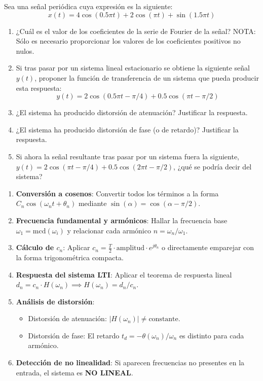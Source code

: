 \newpage
\begin{problema}
Sea una señal periódica cuya expresión es la siguiente:
\[
x(t) = 4\cos(0.5\pi t) + 2\cos(\pi t) + \sin(1.5\pi t)
\]
\begin{enumerate}[label=\alph*)]
    \item ¿Cuál es el valor de los coeficientes de la serie de Fourier de la señal? NOTA: Sólo es necesario proporcionar los valores de los coeficientes positivos no nulos.
    \item Si tras pasar por un sistema lineal estacionario se obtiene la siguiente señal $y(t)$, proponer la función de transferencia de un sistema que pueda producir esta respuesta:
    \[
    y(t) = 2\cos(0.5\pi t - \pi/4) + 0.5\cos(\pi t - \pi/2)
    \]
    \item ¿El sistema ha producido distorsión de atenuación? Justificar la respuesta.
    \item ¿El sistema ha producido distorsión de fase (o de retardo)? Justificar la respuesta.
    \item Si ahora la señal resultante tras pasar por un sistema fuera la siguiente, $y(t) = 2\cos(\pi t - \pi/4) + 0.5\cos(2\pi t - \pi/2)$, ¿qué se podría decir del sistema?
\end{enumerate}
\end{problema}

\begin{mecanizado}
\begin{enumerate}
    \item \textbf{Conversión a cosenos}: Convertir todos los términos a la forma $C_n \cos(\omega_n t + \theta_n)$ mediante $\sin(\alpha) = \cos(\alpha - \pi/2)$.
    \item \textbf{Frecuencia fundamental y armónicos}: Hallar la frecuencia base $\omega_1 = \text{mcd}(\omega_i)$ y relacionar cada armónico $n = \omega_n / \omega_1$.
    \item \textbf{Cálculo de $c_n$}: Aplicar $c_n = \frac{T}{2} \cdot \text{amplitud} \cdot e^{j\theta_n}$ o directamente emparejar con la forma trigonométrica compacta.
    \item \textbf{Respuesta del sistema LTI}: Aplicar el teorema de respuesta lineal $d_n = c_n \cdot H(\omega_n) \implies H(\omega_n) = d_n / c_n$.
    \item \textbf{Análisis de distorsión}:
    \begin{itemize}
        \item Distorsión de atenuación: $|H(\omega_n)| \neq \text{constante}$.
        \item Distorsión de fase: El retardo $t_d = -\theta(\omega_n)/\omega_n$ es distinto para cada armónico.
    \end{itemize}
    \item \textbf{Detección de no linealidad}: Si aparecen frecuencias no presentes en la entrada, el sistema es \textbf{NO LINEAL}.
\end{enumerate}
\end{mecanizado}

